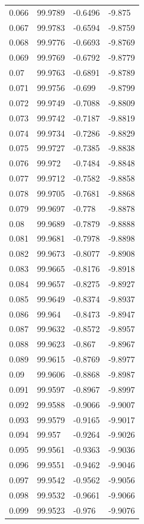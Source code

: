 \begin{tabular}{llll}
0.066 & 99.9789 & -0.6496 & -9.875 \\
0.067 & 99.9783 & -0.6594 & -9.8759 \\
0.068 & 99.9776 & -0.6693 & -9.8769 \\
0.069 & 99.9769 & -0.6792 & -9.8779 \\
0.07 & 99.9763 & -0.6891 & -9.8789 \\
0.071 & 99.9756 & -0.699 & -9.8799 \\
0.072 & 99.9749 & -0.7088 & -9.8809 \\
0.073 & 99.9742 & -0.7187 & -9.8819 \\
0.074 & 99.9734 & -0.7286 & -9.8829 \\
0.075 & 99.9727 & -0.7385 & -9.8838 \\
0.076 & 99.972 & -0.7484 & -9.8848 \\
0.077 & 99.9712 & -0.7582 & -9.8858 \\
0.078 & 99.9705 & -0.7681 & -9.8868 \\
0.079 & 99.9697 & -0.778 & -9.8878 \\
0.08 & 99.9689 & -0.7879 & -9.8888 \\
0.081 & 99.9681 & -0.7978 & -9.8898 \\
0.082 & 99.9673 & -0.8077 & -9.8908 \\
0.083 & 99.9665 & -0.8176 & -9.8918 \\
0.084 & 99.9657 & -0.8275 & -9.8927 \\
0.085 & 99.9649 & -0.8374 & -9.8937 \\
0.086 & 99.964 & -0.8473 & -9.8947 \\
0.087 & 99.9632 & -0.8572 & -9.8957 \\
0.088 & 99.9623 & -0.867 & -9.8967 \\
0.089 & 99.9615 & -0.8769 & -9.8977 \\
0.09 & 99.9606 & -0.8868 & -9.8987 \\
0.091 & 99.9597 & -0.8967 & -9.8997 \\
0.092 & 99.9588 & -0.9066 & -9.9007 \\
0.093 & 99.9579 & -0.9165 & -9.9017 \\
0.094 & 99.957 & -0.9264 & -9.9026 \\
0.095 & 99.9561 & -0.9363 & -9.9036 \\
0.096 & 99.9551 & -0.9462 & -9.9046 \\
0.097 & 99.9542 & -0.9562 & -9.9056 \\
0.098 & 99.9532 & -0.9661 & -9.9066 \\
0.099 & 99.9523 & -0.976 & -9.9076 \\

\end{tabular}
